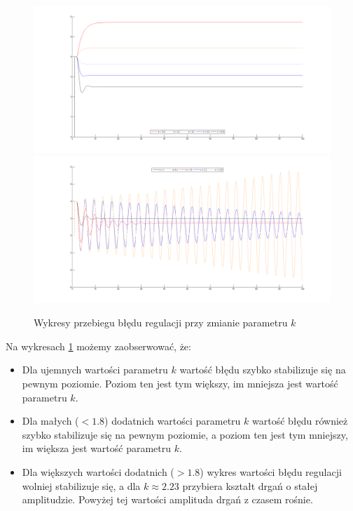 \documentclass[a4paper,10pt]{article}
\begin{document}
\begin{figure}[!h]
    \centering
	\includegraphics[width=120mm]{CW5-N3C2d1-k-03-06.png}
	\includegraphics[width=120mm]{CW5-N3C2d1-k1-225.png}
	\caption{Wykresy przebiegu błędu regulacji przy zmianie parametru $k$}
    \label{fig:symulacjaP}
\end{figure}

Na wykresach \ref{fig:symulacjaP} możemy zaobserwować, że:
\begin{itemize}
	\item Dla ujemnych wartości parametru $k$ wartość błędu szybko stabilizuje się na pewnym poziomie. Poziom ten jest tym większy, im mniejsza jest wartość parametru $k$.
	\item Dla małych ($<1.8$) dodatnich wartości parametru $k$ wartość błędu również szybko stabilizuje się na pewnym poziomie, a poziom ten jest tym mniejszy, im większa jest wartość parametru $k$.
	\item Dla większych wartości dodatnich ($>1.8$) wykres wartości błędu regulacji wolniej stabilizuje się, a dla $k \approx 2.23$ przybiera kształt drgań o stałej amplitudzie. Powyżej tej wartości amplituda drgań z czasem rośnie.
\end{itemize}
\end{document}
